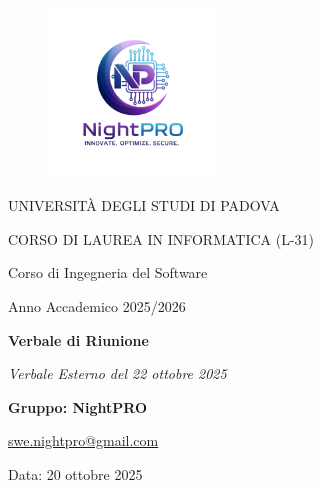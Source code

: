 \documentclass[a4paper, 11pt, oneside]{scrartcl} %
\begin{document}
\thispagestyle{empty}
\begin{titlepage}
    \centering
    
\begin{figure}
    \centering
    \includegraphics[width=0.4\textwidth]{src/immagini/logo.jpg}
\end{figure}

    \vfill
    
    {\small UNIVERSITÀ DEGLI STUDI DI PADOVA \par}
    {\small CORSO DI LAUREA IN INFORMATICA (L-31) \par}
    \vspace{0.5cm}
    {\large Corso di Ingegneria del Software \par}
    {\small Anno Accademico 2025/2026 \par}


    
    \vfill
    
    {\Huge \bfseries Verbale di Riunione \par}
    
    \vspace{1cm}
    
    {\Large \itshape Verbale Esterno del 22 ottobre 2025 \par} 
    
    \vfill
    
    {\Large \bfseries Gruppo: NightPRO \par}
    \vspace{0.5cm}
    {\large \href{mailto:swe.nightpro@gmail.com}{swe.nightpro@gmail.com} \par}
    
    \vfill
    
    {\large Data: 20 ottobre 2025 \par}

\end{titlepage}
\end{document}
